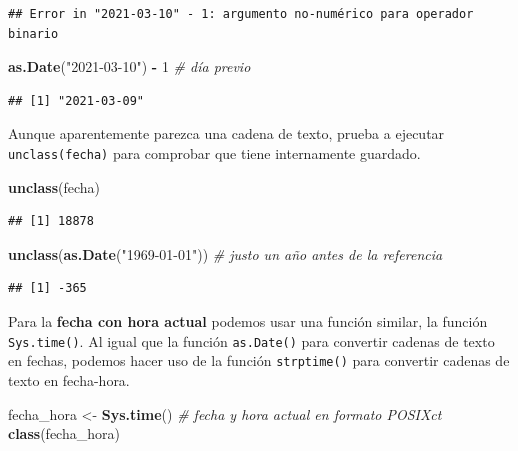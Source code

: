 \documentclass[11pt,]{book}
\newenvironment{Shaded}{\begin{snugshade}}{\end{snugshade}}
\newcommand{\CommentTok}[1]{\textcolor[rgb]{0.37,0.37,0.37}{\textit{#1}}}
\newcommand{\DecValTok}[1]{\textcolor[rgb]{0.06,0.06,0.06}{#1}}
\newcommand{\KeywordTok}[1]{\textcolor[rgb]{0.27,0.27,0.27}{\textbf{#1}}}
\newcommand{\NormalTok}[1]{#1}
\newcommand{\OperatorTok}[1]{\textcolor[rgb]{0.43,0.43,0.43}{\textbf{#1}}}
\newcommand{\StringTok}[1]{\textcolor[rgb]{0.5,0.5,0.5}{#1}}
\begin{document}
\begin{verbatim}
## Error in "2021-03-10" - 1: argumento no-numérico para operador binario
\end{verbatim}

\begin{Shaded}
\begin{Highlighting}[]
\KeywordTok{as.Date}\NormalTok{(}\StringTok{"2021-03-10"}\NormalTok{) }\OperatorTok{-}\StringTok{ }\DecValTok{1} \CommentTok{# día previo}
\end{Highlighting}
\end{Shaded}

\begin{verbatim}
## [1] "2021-03-09"
\end{verbatim}

Aunque aparentemente parezca una cadena de texto, prueba a ejecutar \texttt{unclass(fecha)} para comprobar que tiene internamente guardado.

\begin{Shaded}
\begin{Highlighting}[]
\KeywordTok{unclass}\NormalTok{(fecha)}
\end{Highlighting}
\end{Shaded}

\begin{verbatim}
## [1] 18878
\end{verbatim}

\begin{Shaded}
\begin{Highlighting}[]
\KeywordTok{unclass}\NormalTok{(}\KeywordTok{as.Date}\NormalTok{(}\StringTok{"1969-01-01"}\NormalTok{)) }\CommentTok{# justo un año antes de la referencia}
\end{Highlighting}
\end{Shaded}

\begin{verbatim}
## [1] -365
\end{verbatim}

Para la \textbf{fecha con hora actual} podemos usar una función similar, la función \texttt{Sys.time()}. Al igual que la función \texttt{as.Date()} para convertir cadenas de texto en fechas, podemos hacer uso de la función \texttt{strptime()} para convertir cadenas de texto en fecha-hora.

\begin{Shaded}
\begin{Highlighting}[]
\NormalTok{fecha_hora <-}\StringTok{ }\KeywordTok{Sys.time}\NormalTok{() }\CommentTok{# fecha y hora actual en formato POSIXct}
\KeywordTok{class}\NormalTok{(fecha_hora)}
\end{Highlighting}
\end{Shaded}
\end{document}
